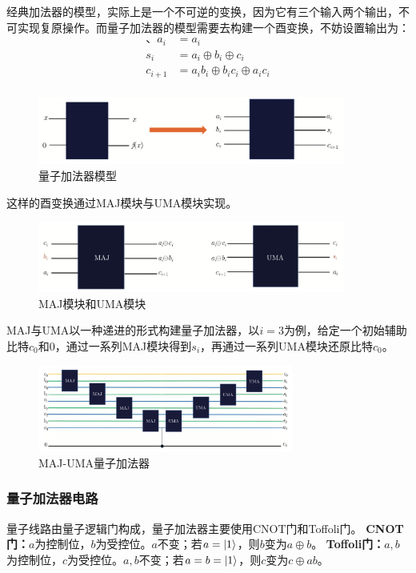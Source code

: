 \documentclass[12pt,hyperref,a4paper,UTF8]{ctexart}
\begin{document}
经典加法器的模型，实际上是一个不可逆的变换，因为它有三个输入两个输出，不可实现复原操作。而量子加法器的模型需要去构建一个酉变换，不妨设置输出为：
$$
\begin{aligned}、
a_i&=a_i\\
s_i&=a_i \oplus b_i \oplus c_i \\
c_{i+1}&=a_i b_i \oplus b_i c_i \oplus a_i c_i\\
\end{aligned}
$$
\vskip -5pt
\begin{figure}[!htbp]
    \centering
    \includegraphics[width =0.9\textwidth]{figures/量子加法器模型.png}
    \caption{量子加法器模型}
\end{figure}
这样的酉变换通过MAJ模块与UMA模块实现。  
\begin{figure}[!htbp]     
    \centering     
    \includegraphics[width =0.9\textwidth]{figures/MAJ模块和UMA模块.png}     
    \caption{MAJ模块和UMA模块} 
\end{figure}

MAJ与UMA以一种递进的形式构建量子加法器，以$i=3$为例，给定一个初始辅助比特$c_0$和$0$，通过一系列MAJ模块得到$s_i$，再通过一系列UMA模块还原比特$c_0$。

\newpage
\begin{figure}[!htbp]     
    \centering     
    \includegraphics[width =0.75\textwidth]{figures/MAJ-UMA量子加法器.png}     
    \caption{MAJ-UMA量子加法器} 
\end{figure}

\subsubsection{量子加法器电路}
量子线路由量子逻辑门构成，量子加法器主要使用CNOT门和Toffoli门。
\vskip 8pt
\textbf{CNOT门：}$a$为控制位，$b$为受控位。$a$不变；若$a=\lvert 1 \rangle$，则$b$变为$a\oplus b$。
\vskip 3pt
\textbf{Toffoli门：}$a,b$为控制位，$c$为受控位。$a,b$不变；若$a=b=\lvert 1 \rangle$，则$c$变为$c\oplus ab$。
\end{document}
